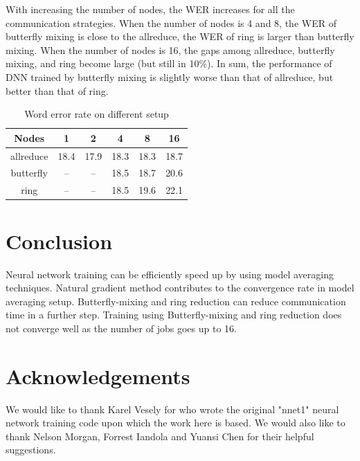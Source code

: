 \documentclass{article}
\begin{document}
With increasing the number of nodes, the WER increases for all the communication strategies. When the number of nodes is 4 and 8, the WER of butterfly mixing is close to the allreduce, the WER of ring is larger than butterfly mixing. When the number of nodes is 16, the gaps among allreduce, butterfly mixing, and ring become large (but still in 10\%). In sum, the performance of DNN trained by butterfly mixing is slightly worse than that of allreduce, but better than that of ring.
\begin{table}
  \centering
  \begin{tabular}{c|c|c|c|c|c}
    \hline
    Nodes       & 1    & 2     & 4    & 8    & 16 \\
    \hline
    allreduce   & 18.4 & 17.9  & 18.3 & 18.3 & 18.7 \\
    butterfly   & --   & --    & 18.5 & 18.7 & 20.6 \\
    ring        & --   & --    & 18.5 & 19.6 & 22.1\\
    \hline
  \end{tabular}
  \caption{Word error rate on different setup}
  \label{tab:wer}
\end{table}

\section{Conclusion}
Neural network training can be efficiently speed up by using model averaging techniques.
Natural gradient method contributes to the convergence rate in model averaging setup.
Butterfly-mixing and ring reduction can reduce communication time in a further step.
Training using Butterfly-mixing and ring reduction does not converge well as the number of jobs goes up to 16.

\section{Acknowledgements}
We would like to thank Karel Vesely for who wrote the original "nnet1" neural network training code
upon which the work here is based. We would also like to thank Nelson Morgan, Forrest Iandola and Yuansi Chen
for their helpful suggestions.



\end{document}
